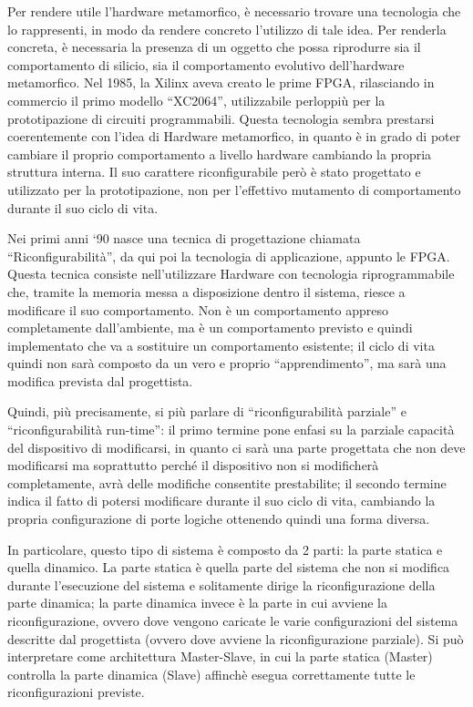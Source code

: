 \documentclass[a4paper,titlepage]{book}
\begin{document}
Per rendere utile l'hardware metamorfico, è necessario trovare una tecnologia che lo rappresenti, in modo da rendere concreto l'utilizzo di tale idea. Per renderla concreta, è necessaria la presenza di un oggetto che possa riprodurre sia il comportamento di silicio, sia il comportamento evolutivo dell'hardware metamorfico. Nel 1985, la Xilinx aveva creato le prime FPGA, rilasciando in commercio il primo modello ``XC2064'', utilizzabile perloppiù per la prototipazione di circuiti programmabili. Questa tecnologia sembra prestarsi coerentemente con l'idea di Hardware metamorfico, in quanto è in grado di poter cambiare il proprio comportamento a livello hardware cambiando la propria struttura interna. Il suo carattere riconfigurabile però è stato progettato e utilizzato per la prototipazione, non per l'effettivo mutamento di comportamento durante il suo ciclo di vita.

Nei primi anni `90 nasce una tecnica di progettazione chiamata ``Riconfigurabilità'', da qui poi la tecnologia di applicazione, appunto le FPGA. Questa tecnica consiste nell'utilizzare Hardware con tecnologia riprogrammabile che, tramite la memoria messa a disposizione dentro il sistema, riesce a modificare il suo comportamento. Non è un comportamento appreso completamente dall'ambiente, ma è un comportamento previsto e quindi implementato che va a sostituire un comportamento esistente; il ciclo di vita quindi non sarà composto da un vero e proprio ``apprendimento'', ma sarà una modifica prevista dal progettista.

Quindi, più precisamente, si più parlare di ``riconfigurabilità parziale'' e ``riconfigurabilità run-time'': il primo termine pone enfasi su la parziale capacità del dispositivo di modificarsi, in quanto ci sarà una parte progettata che non deve modificarsi ma soprattutto perché il dispositivo non si modificherà completamente, avrà delle modifiche consentite prestabilite; il secondo termine indica il fatto di potersi modificare durante il suo ciclo di vita, cambiando la propria configurazione di porte logiche ottenendo quindi una forma diversa.

In particolare, questo tipo di sistema è composto da 2 parti: la parte statica e quella dinamico. La parte statica è quella parte del sistema che non si modifica durante l'esecuzione del sistema e solitamente dirige la riconfigurazione della parte dinamica; la parte dinamica invece è la parte in cui avviene la riconfigurazione, ovvero dove vengono caricate le varie configurazioni del sistema descritte dal progettista (ovvero dove avviene la riconfigurazione parziale).  Si può interpretare come architettura Master-Slave, in cui la parte statica (Master) controlla la parte dinamica (Slave) affinchè esegua correttamente tutte le riconfigurazioni previste.
\end{document}
